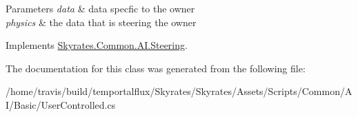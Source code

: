\begin{DoxyParams}{Parameters}
{\em data} & data specfic to the owner\\
\hline
{\em physics} & the data that is steering the owner\\
\hline
\end{DoxyParams}


Implements \hyperlink{class_skyrates_1_1_common_1_1_a_i_1_1_steering_a6ed9adbbc920bf10006fe27ae9764045}{Skyrates.\-Common.\-A\-I.\-Steering}.



The documentation for this class was generated from the following file\-:\begin{DoxyCompactItemize}
\item 
/home/travis/build/temportalflux/\-Skyrates/\-Skyrates/\-Assets/\-Scripts/\-Common/\-A\-I/\-Basic/User\-Controlled.\-cs\end{DoxyCompactItemize}
